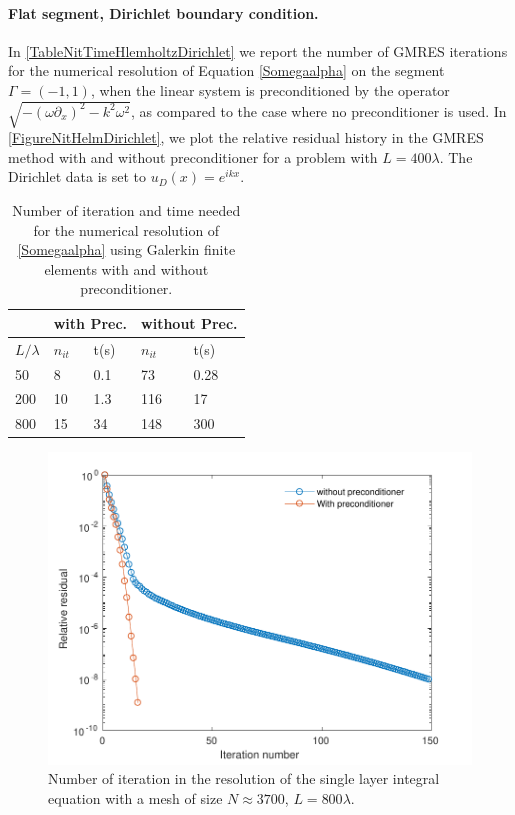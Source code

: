 \documentclass[a4paper]{article}
\begin{document}
\paragraph{Flat segment, Dirichlet boundary condition.} In \autoref{TableNitTimeHlemholtzDirichlet} we report the number of GMRES iterations for the numerical resolution of Equation \eqref{Somegaalpha} on the segment $\Gamma = (-1,1)$, when the linear system is preconditioned by the operator $\sqrt{-(\omega \partial_x)^2 - k^2 \omega^2}$, as compared to the case where no preconditioner is used.  In \autoref{FigureNitHelmDirichlet}, we plot the relative residual history in the GMRES method with and without preconditioner for a problem with $L = 400 \lambda$. The Dirichlet data is set to $u_D(x) = e^{ikx}$. 
\begin{table}[H]
	\begin{center}
		\begin{tabular}{|| m{4em} | m{4em} | m{4em} | m{4em} | m{4em}||} 
			\hline
			\multicolumn{1}{||c|}{ }&
			\multicolumn{2}{c|}{with Prec.}&\multicolumn{2}{c||}{without Prec.}\\
			\hline
			$L/\lambda$ & $n_{it}$& t(s) & $n_{it}$ & t(s)\\
			\hline\hline
			50 & 8 & 0.1 & 73 & 0.28\\
			\hline
			200 & 10 & 1.3 & 116 & 17\\
			\hline
			800 & 15 & 34 & 148 & 300\\
			\hline
		\end{tabular}
	\end{center}
	\caption{Number of iteration and time needed for the numerical resolution of \eqref{Somegaalpha} using Galerkin finite elements with and without preconditioner.}
	\label{TableNitTimeHlemholtzDirichlet}
\end{table}
\vspace{-1cm}
\begin{figure}[H]
	\centering
	\includegraphics[scale=0.5]{../../figs/PrecondDirichletHelmSegPDF}
	\caption{Number of iteration in the resolution of the single layer integral equation with a mesh of size $N \approx 3700$, $L = 800 \lambda$.}
	\label{FigureNitHelmDirichlet}
\end{figure}
\end{document}
